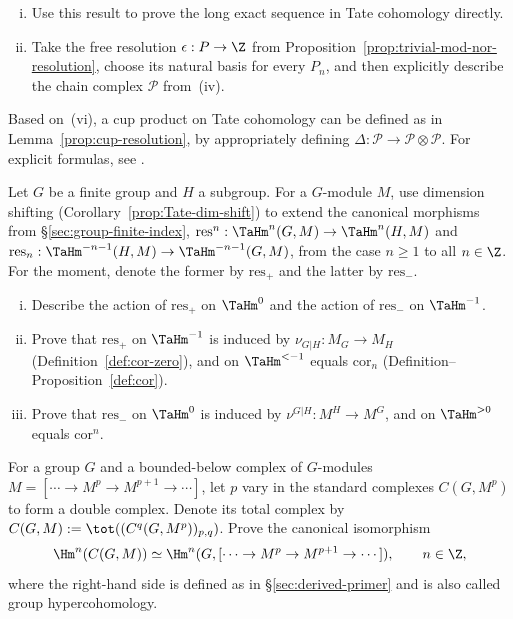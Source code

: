 \begin{Exercises}
\begin{enumerate}[(i)]
		\item Use this result to prove the long exact sequence in Tate
		cohomology directly.
		\item Take the free resolution $\epsilon:P\to\Z$ from
		Proposition~\ref{prop:trivial-mod-nor-resolution}, choose its natural
		basis for every $P_n$, and then explicitly describe the chain complex
		$\mathcal{P}$ from~(iv).
	\end{enumerate}

	Based on~(vi), a cup product on Tate cohomology can be defined as in
	Lemma~\ref{prop:cup-resolution}, by appropriately defining
	$\Delta:\mathcal{P}\to\mathcal{P}\otimes\mathcal{P}$. For explicit
	formulas, see \cite[Chapter IV, \S 7]{CF67}.

	\item Let $G$ be a finite group and $H$ a subgroup. For a $G$-module
	$M$, use dimension shifting (Corollary~\ref{prop:Tate-dim-shift}) to
	extend the canonical morphisms from \S\ref{sec:group-finite-index},
	$\mathrm{res}^n:\TaHm^n(G,M)\to\TaHm^n(H,M)$ and
	$\mathrm{res}_n:\TaHm^{-n-1}(H,M)\to\TaHm^{-n-1}(G,M)$, from the case
	$n\geq1$ to all $n\in\Z$. For the moment, denote the former by
	$\mathrm{res}_+$ and the latter by $\mathrm{res}_-$.
	\begin{enumerate}[(i)]
		\item Describe the action of $\mathrm{res}_+$ on $\TaHm^0$ and the
		action of $\mathrm{res}_-$ on $\TaHm^{-1}$.
		\item Prove that $\mathrm{res}_+$ on $\TaHm^{-1}$ is induced by
		$\nu_{G|H}:M_G\to M_H$ (Definition~\ref{def:cor-zero}), and on
		$\TaHm^{<-1}$ equals $\mathrm{cor}_n$
		(Definition--Proposition~\ref{def:cor}).
		\item Prove that $\mathrm{res}_-$ on $\TaHm^0$ is induced by
		$\nu^{G|H}:M^H\to M^G$, and on $\TaHm^{>0}$ equals
		$\mathrm{cor}^n$.
	\end{enumerate}

	\item For a group $G$ and a bounded-below complex of $G$-modules
	$M=[\cdots\to M^p\to M^{p+1}\to\cdots]$, let $p$ vary in the standard
	complexes $C(G,M^p)$ to form a double complex. Denote its total complex by
	$C(G,M):=\tot((C^q(G,M^p))_{p,q})$. Prove the canonical isomorphism
	\[ \Hm^n(C(G,M))\simeq
	\Hm^n(G,[\cdots\to M^p\to M^{p+1}\to\cdots]),\qquad n\in\Z, \]
	where the right-hand side is defined as in \S\ref{sec:derived-primer} and
	is also called group hypercohomology.


\end{Exercises}
